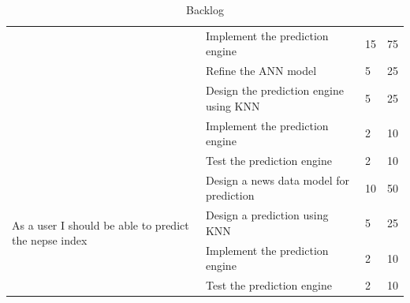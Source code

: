 {\begin{table}
\begin{tabular}{|p{3cm}|p{7cm}|p{2cm}|p{2cm}|}
		\cline{2-4}
		& Implement the prediction engine & 15 & 75\\
	\cline{2-4}
	& Refine the ANN model & 5 & 25\\
	\cline{2-4}
	& Design the prediction engine using KNN & 5 & 25\\
	\cline{2-4}
	& Implement the prediction engine & 2 & 10\\
	\cline{2-4}	
	& Test the prediction engine & 2 & 10\\
	\hline
	\multirow{5}{3cm}{As a user I should be able to predict the nepse index} & Design a news data model for prediction & 10 & 50\\
	\cline{2-4}
	& Design a prediction using KNN & 5 & 25\\
	\cline{2-4}
	& Implement the prediction engine & 2 & 10\\
	\cline{2-4}
	& Test the prediction engine & 2 & 10\\
	\hline
	\end{tabular}
	\caption{Backlog}
	\label{tab:Backlog}

\end{table}
}





